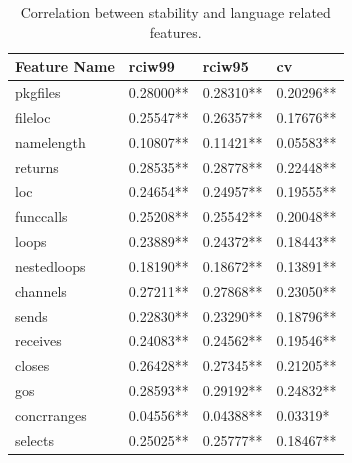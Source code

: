 \documentclass{seal_thesis}
\begin{document}
\begin{table}[H]
	\centering
	\caption{Correlation between stability and language related features.}
	\label{table:languagefeatures}
	\begin{tabular}{@{}llll@{}}
		Feature Name & rciw99 & rciw95 & cv \\
		\toprule
		pkgfiles & \cellcolor[HTML]{FFCC99}0.28000** & \cellcolor[HTML]{FFCC99}0.28310** & \cellcolor[HTML]{99CCFF}0.20296** \\
		fileloc & \cellcolor[HTML]{FFCC99}0.25547** & \cellcolor[HTML]{FFCC99}0.26357** & \cellcolor[HTML]{99CCFF}0.17676** \\
		namelength & \cellcolor[HTML]{99CCFF}0.10807** & \cellcolor[HTML]{99CCFF}0.11421** & \cellcolor[HTML]{3366FF}0.05583** \\
		returns & \cellcolor[HTML]{FFCC99}0.28535** & \cellcolor[HTML]{FFCC99}0.28778** & \cellcolor[HTML]{C0C0C0}0.22448** \\
		loc & \cellcolor[HTML]{C0C0C0}0.24654** & \cellcolor[HTML]{C0C0C0}0.24957** & \cellcolor[HTML]{99CCFF}0.19555** \\
		funccalls & \cellcolor[HTML]{C0C0C0}0.25208** & \cellcolor[HTML]{FFCC99}0.25542** & \cellcolor[HTML]{99CCFF}0.20048** \\
		loops & \cellcolor[HTML]{C0C0C0}0.23889** & \cellcolor[HTML]{C0C0C0}0.24372** & \cellcolor[HTML]{99CCFF}0.18443** \\
		nestedloops & \cellcolor[HTML]{99CCFF}0.18190** & \cellcolor[HTML]{99CCFF}0.18672** & \cellcolor[HTML]{99CCFF}0.13891** \\
		channels & \cellcolor[HTML]{FFCC99}0.27211** & \cellcolor[HTML]{FFCC99}0.27868** & \cellcolor[HTML]{C0C0C0}0.23050** \\
		sends & \cellcolor[HTML]{C0C0C0}0.22830** & \cellcolor[HTML]{C0C0C0}0.23290** & \cellcolor[HTML]{99CCFF}0.18796** \\
		receives & \cellcolor[HTML]{C0C0C0}0.24083** & \cellcolor[HTML]{C0C0C0}0.24562** & \cellcolor[HTML]{99CCFF}0.19546** \\
		closes & \cellcolor[HTML]{FFCC99}0.26428** & \cellcolor[HTML]{FFCC99}0.27345** & \cellcolor[HTML]{99CCFF}0.21205** \\
		gos & \cellcolor[HTML]{FFCC99}0.28593** & \cellcolor[HTML]{FFCC99}0.29192** & \cellcolor[HTML]{C0C0C0}0.24832** \\
		concrranges & \cellcolor[HTML]{3366FF}0.04556** & \cellcolor[HTML]{3366FF}0.04388** & \cellcolor[HTML]{3366FF}0.03319* \\
		selects & \cellcolor[HTML]{C0C0C0}0.25025** & \cellcolor[HTML]{FFCC99}0.25777** & \cellcolor[HTML]{99CCFF}0.18467** \\

\end{tabular}
\end{table}
\end{document}
